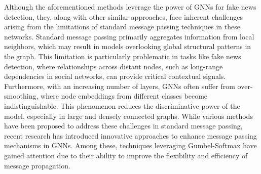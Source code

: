 Although the aforementioned methods leverage the power of GNNs for fake news detection, they, along with other similar approaches, face inherent challenges arising from the limitations of standard message passing techniques in these networks.
Standard message passing primarily aggregates information from local neighbors, which may result in models overlooking global structural patterns in the graph.
This limitation is particularly problematic in tasks like fake news detection, where relationships across distant nodes, such as long-range dependencies in social networks, can provide critical contextual signals.
Furthermore, with an increasing number of layers, GNNs often suffer from over-smoothing, where node embeddings from different classes become indistinguishable.
This phenomenon reduces the discriminative power of the model, especially in large and densely connected graphs.
While various methods have been proposed to address these challenges in standard message passing, recent research has introduced innovative approaches to enhance message passing mechanisms in GNNs.
Among these, techniques leveraging Gumbel-Softmax have gained attention due to their ability to improve the flexibility and efficiency of message propagation.

